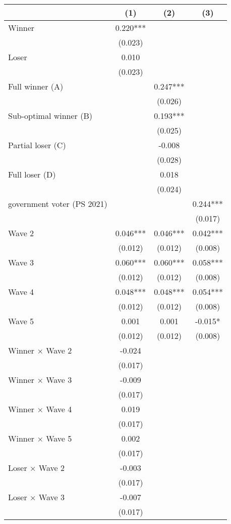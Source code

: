 \begin{tabular}[t]{lccc}
\toprule
  & (1) & (2) & (3)\\
\midrule
Winner & 0.220*** &  & \\
 & (0.023) &  \vphantom{1} & \\
Loser & 0.010 &  & \\
 & (0.023) &  & \\
Full winner (A) &  & 0.247*** & \\
 &  & (0.026) & \\
Sub-optimal winner (B) &  & 0.193*** & \\
 &  & (0.025) & \\
Partial loser (C) &  & -0.008 & \\
 &  & (0.028) & \\
Full loser (D) &  & 0.018 & \\
 &  & (0.024) & \\
government voter (PS 2021) &  &  & 0.244***\\
 &  &  & \vphantom{4} (0.017)\\
Wave 2 & 0.046*** & 0.046*** & 0.042***\\
 & (0.012) & (0.012) & \vphantom{3} (0.008)\\
Wave 3 & 0.060*** & 0.060*** & 0.058***\\
 & (0.012) & (0.012) & \vphantom{2} (0.008)\\
Wave 4 & 0.048*** & 0.048*** & 0.054***\\
 & (0.012) & (0.012) & \vphantom{1} (0.008)\\
Wave 5 & 0.001 & 0.001 & -0.015*\\
 & (0.012) & (0.012) & (0.008)\\
Winner × Wave 2 & -0.024 &  & \\
 & (0.017) &  \vphantom{7} & \\
Winner × Wave 3 & -0.009 &  & \\
 & (0.017) &  \vphantom{6} & \\
Winner × Wave 4 & 0.019 &  & \\
 & (0.017) &  \vphantom{5} & \\
Winner × Wave 5 & 0.002 &  & \\
 & (0.017) &  \vphantom{4} & \\
Loser × Wave 2 & -0.003 &  & \\
 & (0.017) &  \vphantom{3} & \\
Loser × Wave 3 & -0.007 &  & \\
 & (0.017) &  \vphantom{2} & \\

\end{tabular}
